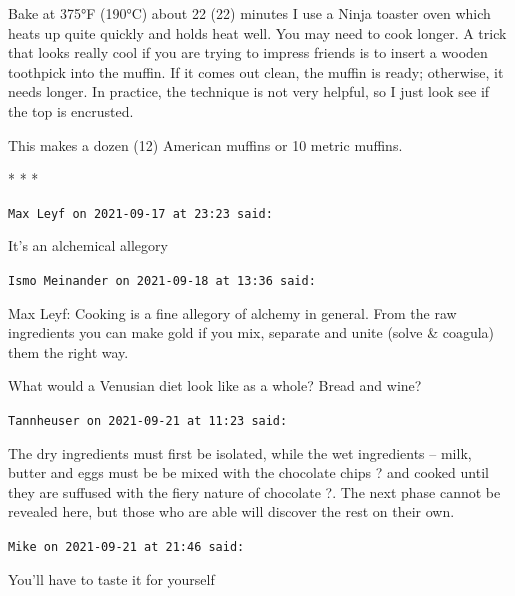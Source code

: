 Bake at 375°F (190°C) about 22 (22) minutes I use a Ninja toaster oven which heats up quite quickly and holds heat well. You may need to cook longer. A trick that looks really cool if you are trying to impress friends is to insert a wooden toothpick into the muffin. If it comes out clean, the muffin is ready; otherwise, it needs longer. In practice, the technique is not very helpful, so I just look see if the top is encrusted.

This makes a dozen (12) American muffins or 10 metric muffins.



\begin{center}* * *\end{center}

\begin{footnotesize}
\begin{sffamily}
\texttt{Max Leyf on 2021-09-17 at 23:23 said:}

It's an alchemical allegory

\hfill

\texttt{Ismo Meinander on 2021-09-18 at 13:36 said:}

Max Leyf: Cooking is a fine allegory of alchemy in general. From the raw ingredients you can make gold if you mix, separate and unite (solve \& coagula) them the right way.

What would a Venusian diet look like as a whole? Bread and wine?

\hfill

\texttt{Tannheuser on 2021-09-21 at 11:23 said:}

The dry ingredients must first be isolated, while the wet ingredients -- milk, butter and eggs must be be mixed with the chocolate chips ? and cooked until they are suffused with the fiery nature of chocolate ?. The next phase cannot be revealed here, but those who are able will discover the rest on their own.

\hfill

\texttt{Mike on 2021-09-21 at 21:46 said:}

You'll have to taste it for yourself


\hfill

\end{sffamily}
\end{footnotesize}

